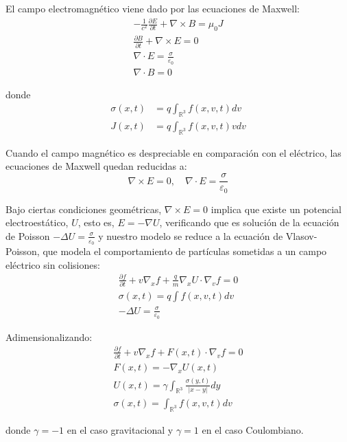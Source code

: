 \documentclass[a4paper,10pt]{scrartcl}
\theoremstyle{definition}
\numberwithin{equation}{section}
\begin{document}
El campo electromagnético viene dado por las ecuaciones de Maxwell:
\begin{align*}
 -\frac{1}{c^2} \frac{\partial E}{\partial t} + \nabla \times B = \mu_0 J\\
 \frac{\partial B}{\partial t} + \nabla \times E = 0\\
 \nabla \cdot E = \frac{\sigma}{\varepsilon_0}\\
 \nabla \cdot B = 0
\end{align*}

donde 
\begin{align*}
\sigma(x,t) &= q \int_{\mathbb{R}^3} f(x,v,t) dv\\
J(x,t) &= q \int_{\mathbb{R}^3} f(x,v,t) v dv
\end{align*}

Cuando el campo magnético es despreciable en comparación con el eléctrico, las ecuaciones de Maxwell quedan reducidas a:
\begin{equation*}
 \nabla \times E = 0, \quad \nabla \cdot E = \frac{\sigma}{\varepsilon_0}
\end{equation*}

Bajo ciertas condiciones geométricas, $\nabla \times E = 0$ implica que existe un potencial electroestático, $U$, esto es, $E = - \nabla U$, verificando que es solución de la ecuación de Poisson $-\Delta U = \frac{\sigma}{\varepsilon_0}$ y nuestro modelo se reduce a la ecuación de Vlasov-Poisson, que modela el comportamiento de partículas sometidas a un campo eléctrico sin colisiones:
\begin{align}
 \frac{\partial f}{\partial t} + v \nabla_x f + \frac{q}{m}\nabla_x U \cdot \nabla_v f = 0 \nonumber\\
 \sigma(x,t) = q \int f(x,v,t) dv \nonumber\\
 -\Delta U = \frac{\sigma}{\varepsilon_0}
\end{align}


Adimensionalizando:
\begin{align}
\label{eqn:v-poisson}
 \frac{\partial f}{\partial t} + v \nabla_x f + F(x,t) \cdot \nabla_v f = 0 \nonumber \\
 F(x,t) = - \nabla_x U(x,t) \nonumber \\ 
 U(x,t) = \gamma \int_{\mathbb{R}^3} \frac{\sigma(y,t)}{|x-y|} dy \nonumber \\
 \sigma(x,t) = \int_{\mathbb{R}^3} f(x,v,t) dv
\end{align}

donde $\gamma = -1$ en el caso gravitacional y $\gamma = 1$ en el caso Coulombiano.
\end{document}
